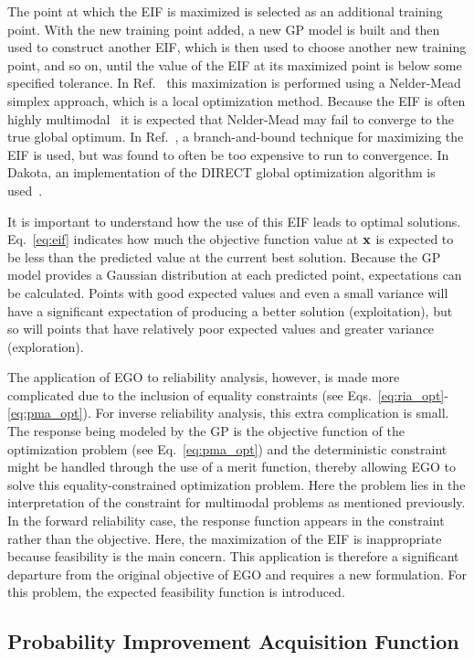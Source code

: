 The point at which the EIF is maximized is selected as an additional training 
point.
With the new training point added, a new GP model is built and then used 
to construct another EIF, which is then used to choose another new training 
point, and so on, until the value of the EIF at its maximized point is below 
some specified tolerance.
In Ref.~\cite{Hua06} this maximization is performed using a Nelder-Mead
simplex approach, which is a local optimization method.
Because the EIF is often highly multimodal~\cite{Jon98} it is expected that 
Nelder-Mead may fail to converge to the true global optimum.
In Ref.~\cite{Jon98}, a branch-and-bound technique for maximizing the EIF
is used, but was found to often be too expensive to run to convergence.
In Dakota, an implementation of the DIRECT global optimization algorithm is 
used~\cite{Gab01}.

It is important to understand how the use of this EIF leads to optimal
solutions.
Eq.~\ref{eq:eif} indicates how much the objective function value at ${\bf x}$ 
is expected to be less than the predicted value at the current best solution. 
Because the GP model provides a Gaussian distribution at each predicted 
point, expectations can be calculated.
Points with good expected values and even a small variance will
have a significant expectation of producing a better solution (exploitation), 
but so will points that have relatively poor expected values and greater 
variance (exploration).

The application of EGO to reliability analysis, however, is made more 
complicated due to the inclusion of equality constraints 
(see Eqs.~\ref{eq:ria_opt}-\ref{eq:pma_opt}).
For inverse reliability analysis, this extra complication is small.
The response being modeled by the GP is the objective function of the optimization 
problem (see Eq.~\ref{eq:pma_opt}) and the deterministic constraint might be handled 
through the use of a merit function, thereby allowing EGO to solve this 
equality-constrained optimization problem.
Here the problem lies in the interpretation of the constraint for multimodal
problems as mentioned previously.
In the forward reliability case, the response function appears in the
constraint rather than the objective.
Here, the maximization of the EIF is inappropriate because feasibility is
the main concern.
This application is therefore a significant departure from the original
objective of EGO and requires a new formulation.
For this problem, the expected feasibility function is introduced.


\subsection{Probability Improvement Acquisition Function}\label{uq:ego:acq:pi}

